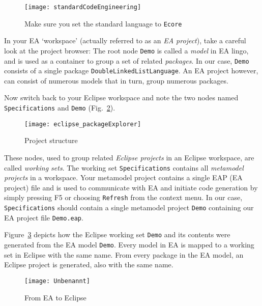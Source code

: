
\begin{figure}[htbp]
    \centering
    \texttt{[image: standardCodeEngineering]}
    \caption{Make sure you set the standard language to \texttt{Ecore}}
    \label{fig_standardSCEEA}
 \end{figure}
 
\clearpage

In your EA `workspace' (actually referred to as an \emph{EA project}), take a careful  look at the project browser:  The root node \texttt{Demo} is called a
\emph{model} in EA lingo, and is used as a container to group a set of related \emph{packages}. In our case, \texttt{Demo}  consists of a single package
\texttt{DoubleLinkedListLanguage}. An EA project however, can consist of numerous models that in turn, group numerous packages.

Now switch back to your Eclipse workspace and note the two nodes named \texttt{Spe\-ci\-fi\-ca\-tions} and \texttt{Demo} (Fig.~\ref{fig_eclipsePS}).

\begin{figure}[htbp]
    \centering
    \texttt{[image: eclipse\_packageExplorer]}
    \caption{Project structure}
    \label{fig_eclipsePS}
 \end{figure}


These nodes, used to group related \emph{Eclipse projects} in an Eclipse workspace, are called \emph{working sets}. The working set
\texttt{Spe\-ci\-fi\-ca\-tions} contains all \emph{metamodel projects} in a  workspace. Your metamodel project contains a single EAP (EA project) file and is
used to communicate with EA and initiate code generation by simply pressing F5 or choosing \texttt{Refresh} from the context menu.
In our case, \texttt{Specifications} should contain a single metamodel project \texttt{Demo} containing our EA project file  \texttt{Demo.eap}.
 
Figure~\ref{fig_fromEAtoEclipse} depicts how the Eclipse working set \texttt{Demo} and its contents were generated from the EA model \texttt{Demo}. Every model
in EA is mapped to a working set in Eclipse with the same name. From every package in the EA model, an Eclipse project is generated, also with the same name.

\begin{figure}[htbp]
    \centering
  \texttt{[image: Unbenannt]}
    \caption{From EA to Eclipse}
    \label{fig_fromEAtoEclipse}
\end{figure}

